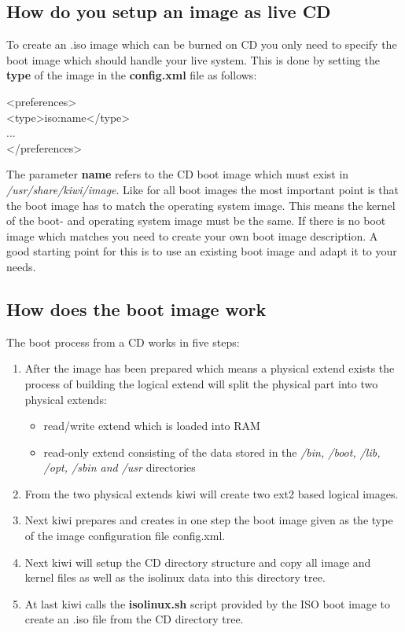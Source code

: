 \subsection{How do you setup an image as live CD}
To create an .iso image which can be burned on CD you only need
to specify the boot image which should handle your live system.
This is done by setting the \textbf{type} of the image in the
\textbf{config.xml} file as follows:

\begin{Command}{9cm}
<preferences>\\
\hspace*{1cm}<type>iso:name</type>\\
\hspace*{1cm}...\\
</preferences>
\end{Command}

The parameter \textbf{name} refers to the CD boot image which
must exist in \textit{/usr/share/kiwi/image}. Like for all boot
images the most important point is that the boot image has to
match the operating system image. This means the kernel of the boot-
and operating system image must be the same. If there is no
boot image which matches you need to create your own boot image
description. A good starting point for this is to use an existing
boot image and adapt it to your needs.

\subsection{How does the boot image work}
The boot process from a CD works in five steps:

\begin{enumerate}
\item After the image has been prepared which means a physical extend
      exists the process of building the logical extend will split
      the physical part into two physical extends:
      \begin{itemize}
      \item read/write extend which is loaded into RAM
      \item read-only extend consisting of the data stored
            in the \textit{/bin, /boot, /lib, /opt, /sbin and /usr}
            directories
      \end{itemize}
\item From the two physical extends kiwi will create two ext2
      based logical images.
\item Next kiwi prepares and creates in one step the boot image given 
      as the type of the image configuration file config.xml.
\item Next kiwi will setup the CD directory structure and copy all
      image and kernel files as well as the isolinux data into this
      directory tree.
\item At last kiwi calls the \textbf{isolinux.sh} script provided
      by the ISO boot image to create an .iso file from the CD
      directory tree.
\end{enumerate}
